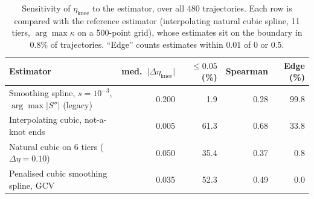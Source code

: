\begin{table}[t]
\centering
\small
\caption{Sensitivity of $\eta_{\mathrm{knee}}$ to the estimator, over all 480 trajectories. Each row is compared with the reference estimator (interpolating natural cubic spline, 11 tiers, $\arg\max\kappa$ on a 500-point grid), whose estimates sit on the boundary in 0.8\% of trajectories. ``Edge'' counts estimates within $0.01$ of $0$ or $0.5$.}
\label{tab:ablation}
\begin{tabular}{@{}p{4.3cm}rrrr@{}}
\toprule
Estimator & med.\ $\lvert\Delta\eta_{\mathrm{knee}}\rvert$ & $\le 0.05$ (\%) & Spearman & Edge (\%) \\
\midrule
Smoothing spline, $s=10^{-3}$, $\arg\max\lvert S''\rvert$ (legacy) & 0.200 & 1.9 & 0.28 & 99.8 \\
Interpolating cubic, not-a-knot ends & 0.005 & 61.3 & 0.68 & 33.8 \\
Natural cubic on 6 tiers ($\Delta\eta=0.10$) & 0.050 & 35.4 & 0.37 & 0.8 \\
Penalised cubic smoothing spline, GCV & 0.035 & 52.3 & 0.49 & 0.0 \\
\bottomrule
\end{tabular}
\end{table}
